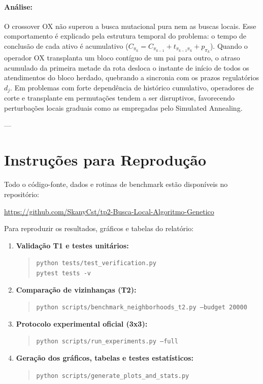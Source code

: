\documentclass[11pt,a4paper]{article}
\begin{document}
\paragraph{Análise:} O crossover OX não superou a busca mutacional pura nem as buscas locais. Esse comportamento é explicado pela estrutura temporal do problema: o tempo de conclusão de cada ativo é acumulativo ($C_{\pi_k} = C_{\pi_{k-1}} + t_{\pi_{k-1}\pi_k} + p_{\pi_k}$). Quando o operador OX transplanta um bloco contíguo de um pai para outro, o atraso acumulado da primeira metade da rota desloca o instante de início de todos os atendimentos do bloco herdado, quebrando a sincronia com os prazos regulatórios $d_j$. Em problemas com forte dependência de histórico cumulativo, operadores de corte e transplante em permutações tendem a ser disruptivos, favorecendo perturbações locais graduais como as empregadas pelo Simulated Annealing.

---

\section{Instruções para Reprodução}

Todo o código-fonte, dados e rotinas de benchmark estão disponíveis no repositório:
\begin{center}
\url{https://github.com/SkanyCst/tp2-Busca-Local-Algoritmo-Genetico}
\end{center}

Para reproduzir os resultados, gráficos e tabelas do relatório:
\begin{enumerate}
    \item \textbf{Validação T1 e testes unitários:}
    \begin{quote}
    \texttt{python tests/test\_verification.py} \\
    \texttt{pytest tests -v}
    \end{quote}
    \item \textbf{Comparação de vizinhanças (T2):}
    \begin{quote}
    \texttt{python scripts/benchmark\_neighborhoods\_t2.py --budget 20000}
    \end{quote}
    \item \textbf{Protocolo experimental oficial (3x3):}
    \begin{quote}
    \texttt{python scripts/run\_experiments.py --full}
    \end{quote}
    \item \textbf{Geração dos gráficos, tabelas e testes estatísticos:}
    \begin{quote}
    \texttt{python scripts/generate\_plots\_and\_stats.py}
    \end{quote}
\end{enumerate}
\end{document}
